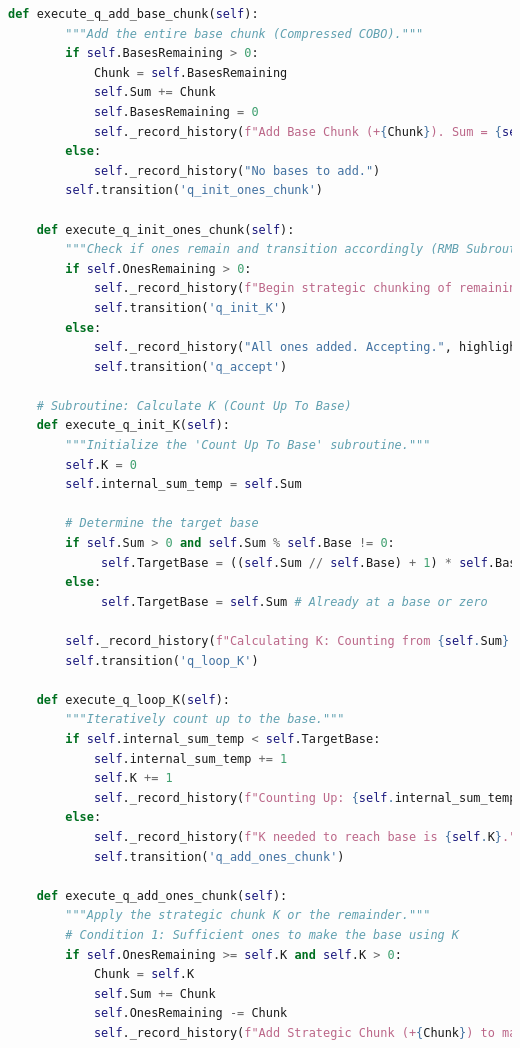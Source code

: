 \documentclass[11pt]{article}
\begin{document}
\begin{lstlisting}[language=Python]
    def execute_q_add_base_chunk(self):
        """Add the entire base chunk (Compressed COBO)."""
        if self.BasesRemaining > 0:
            Chunk = self.BasesRemaining
            self.Sum += Chunk
            self.BasesRemaining = 0
            self._record_history(f"Add Base Chunk (+{Chunk}). Sum = {self.Sum}.", highlight=True)
        else:
            self._record_history("No bases to add.")
        self.transition('q_init_ones_chunk')

    def execute_q_init_ones_chunk(self):
        """Check if ones remain and transition accordingly (RMB Subroutine Start)."""
        if self.OnesRemaining > 0:
            self._record_history(f"Begin strategic chunking of remaining ones ({self.OnesRemaining}).")
            self.transition('q_init_K')
        else:
            self._record_history("All ones added. Accepting.", highlight=True)
            self.transition('q_accept')

    # Subroutine: Calculate K (Count Up To Base)
    def execute_q_init_K(self):
        """Initialize the 'Count Up To Base' subroutine."""
        self.K = 0
        self.internal_sum_temp = self.Sum

        # Determine the target base
        if self.Sum > 0 and self.Sum % self.Base != 0:
             self.TargetBase = ((self.Sum // self.Base) + 1) * self.Base
        else:
             self.TargetBase = self.Sum # Already at a base or zero

        self._record_history(f"Calculating K: Counting from {self.Sum} to {self.TargetBase}.")
        self.transition('q_loop_K')

    def execute_q_loop_K(self):
        """Iteratively count up to the base."""
        if self.internal_sum_temp < self.TargetBase:
            self.internal_sum_temp += 1
            self.K += 1
            self._record_history(f"Counting Up: {self.internal_sum_temp}, K={self.K}")
        else:
            self._record_history(f"K needed to reach base is {self.K}.")
            self.transition('q_add_ones_chunk')

    def execute_q_add_ones_chunk(self):
        """Apply the strategic chunk K or the remainder."""
        # Condition 1: Sufficient ones to make the base using K
        if self.OnesRemaining >= self.K and self.K > 0:
            Chunk = self.K
            self.Sum += Chunk
            self.OnesRemaining -= Chunk
            self._record_history(f"Add Strategic Chunk (+{Chunk}) to make base. Sum = {self.Sum}.", highlight=True)


\end{lstlisting}
\end{document}

